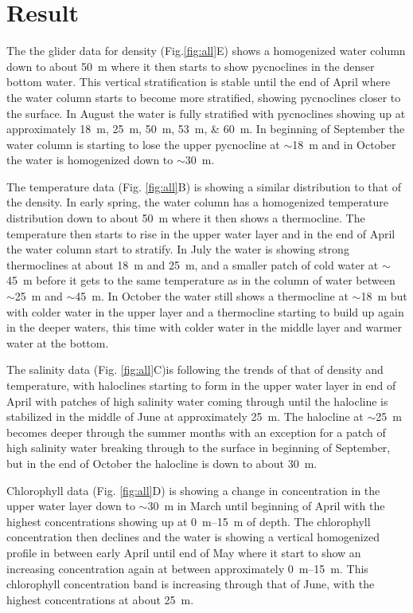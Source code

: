 \documentclass[../Main.tex]{subfiles}
\begin{document}
\section*{\crule[blue]{.3cm}{.3cm} Result}
The the glider data for density (Fig.\ref{fig:all}E) shows a homogenized water column down to about \SI{50}{\metre} where it then starts to show pycnoclines in the denser bottom water.
 This vertical stratification is stable until the end of April where the water column starts to become more stratified, showing pycnoclines closer to the surface.
In August the water is fully stratified with pycnoclines showing up at approximately \SIlist{18;25;50;53;60}{\metre}. 
In beginning of September the water column is starting to lose the upper pycnocline at $\sim$\SI{18}{\metre} and in October the water is homogenized down to $\sim$\SI{30}{\metre}.

The temperature data (Fig. \ref{fig:all}B) is showing a similar distribution to that of the density. 
In early spring, the water column has a homogenized temperature distribution down to about \SI{50}{\metre} where it then shows a thermocline. 
The temperature then starts to rise in the upper water layer and in the end of April the water column start to stratify. 
In July the water is showing strong thermoclines at about \SI{18}{\metre} and \SI{25}{\metre}, and a smaller patch of cold water at $\sim$\SI{45}{\metre} before it gets to the same temperature as in the column of water between $\sim$\SI{25}{\metre} and $\sim$\SI{45}{\metre}. 
In October the water still shows a thermocline at $\sim$\SI{18}{\metre} but with colder water in the upper layer and a thermocline starting to build up again in the deeper waters, this time with colder water in the middle layer and warmer water at the bottom. 

The salinity data (Fig. \ref{fig:all}C)is following the trends of that of density and temperature, with haloclines starting to form in the upper water layer in end of April with patches of high salinity water coming through until the halocline is stabilized in the middle of June at approximately \SI{25}{\metre}. 
The halocline at $\sim$\SI{25}{\metre} becomes deeper through the summer months with an exception for a patch of high salinity water breaking through to the surface in beginning of September, but in the end of October the halocline is down to about \SI{30}{\metre}. 

Chlorophyll data (Fig. \ref{fig:all}D) is showing a change in concentration in the upper water layer down to $\sim$\SI{30}{\metre} in March until beginning of April with the highest concentrations showing up at \SIrange{0}{15}{\metre} of depth. 
The chlorophyll concentration then declines and the water is showing a vertical homogenized profile in between early April until end of May where it start to show an increasing concentration again at between approximately \SIrange{0}{15}{\metre}. 
This chlorophyll concentration band is increasing through that of June, with the highest concentrations at about \SI{25}{\metre}.
\end{document}
